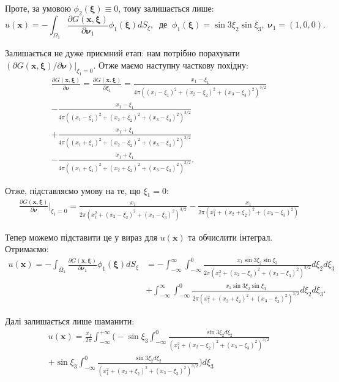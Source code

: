 \documentclass{hw_template}
\begin{document}
Проте, за умовою $\phi_2(\boldsymbol{\xi}) \equiv 0$, тому залишається лише:
\begin{equation*}
    u(\mathbf{x}) = -\int_{\Omega_1}\frac{\partial G(\mathbf{x}, \boldsymbol{\xi})}{\partial \boldsymbol{\nu}_1}\phi_1(\boldsymbol{\xi})dS_{\xi}, \; \; \text{де} \; \;\phi_1(\boldsymbol{\xi}) = \sin 3\xi_2 \sin \xi_3, \; \boldsymbol{\nu}_1 = (1,0,0).
\end{equation*}

Залишається не дуже приємний етап: нам потрібно порахувати $(\partial G(\mathbf{x},\boldsymbol{\xi})/\partial \boldsymbol{\nu})\big|_{\xi_1=0}$. Отже маємо наступну часткову похідну:
\begin{align*}
    \frac{\partial G(\mathbf{x},\boldsymbol{\xi})}{\partial \boldsymbol{\nu}} = \frac{\partial G(\mathbf{x},\boldsymbol{\xi})}{\partial \xi_1} = \frac{x_1-\xi_1}{4\pi\left((x_1-\xi_1)^2 + (x_2-\xi_2)^2 + (x_3-\xi_3)^2\right)^{3/2}} \\- \frac{x_1-\xi_1}{4\pi\left((x_1-\xi_1)^2 + (x_2+\xi_2)^2 + (x_3-\xi_3)^2\right)^{3/2}} \\
    + \frac{x_1+\xi_1}{4\pi\left((x_1+\xi_1)^2 + (x_2-\xi_2)^2 + (x_3-\xi_3)^2\right)^{3/2}} \\ - \frac{x_1+\xi_1}{4\pi\left((x_1+\xi_1)^2 + (x_2+\xi_2)^2 + (x_3-\xi_3)^2\right)^{3/2}}.
\end{align*}

Отже, підставляємо умову на те, що $\xi_1=0$:
\begin{align*}
    \frac{\partial G(\mathbf{x},\boldsymbol{\xi})}{\partial \boldsymbol{\nu}}\Big|_{\xi_1=0} = \frac{x_1}{2\pi\left(x_1^2+(x_2-\xi_2)^2+(x_3-\xi_3)^2\right)^{3/2}} - \frac{x_1}{2\pi\left(x_1^2+(x_2+\xi_2)^2+(x_3-\xi_3)^2\right)}
\end{align*}

Тепер можемо підставити це у вираз для $u(\mathbf{x})$ та обчислити інтеграл. Отримаємо:
\begin{align*}
    u(\mathbf{x}) = -\int_{\Omega_1}\frac{\partial G(\mathbf{x}, \boldsymbol{\xi})}{\partial \boldsymbol{\nu}_1}\phi_1(\boldsymbol{\xi})dS_{\xi} &= -\int_{-\infty}^{\infty}\int_{-\infty}^{0}\frac{x_1\sin 3\xi_2 \sin \xi_3}{2\pi\left(x_1^2+(x_2-\xi_2)^2+(x_3-\xi_3)^2\right)^{3/2}} d\xi_2 d\xi_3 \\&+ \int_{-\infty}^{\infty}\int_{-\infty}^{0}\frac{x_1\sin 3\xi_2 \sin \xi_3}{2\pi\left(x_1^2+(x_2+\xi_2)^2+(x_3-\xi_3)^2\right)^{3/2}} d\xi_2 d\xi_3.
\end{align*}

Далі залишається лише шаманити:
\begin{align*}
    u(\mathbf{x}) = \frac{x_1}{2\pi}\int_{-\infty}^{+\infty}\Bigg(-\sin\xi_3\int_{-\infty}^0 \frac{\sin 3\xi_2d\xi_2}{\left(x_1^2+(x_2-\xi_2)^2+(x_3-\xi_3)^2\right)^{3/2}} \\+ \sin\xi_3 \int_{-\infty}^0 \frac{\sin 3\xi_2d\xi_2}{\left(x_1^2+(x_2+\xi_2)^2+(x_3-\xi_3)^2\right)^{3/2}} \Bigg)d\xi_3
\end{align*}
\end{document}
